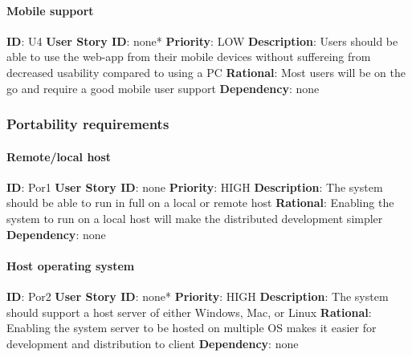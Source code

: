 \documentclass{article}
\begin{document}
\paragraph{Mobile support}\label{req:}
\textbf{ID}: U4\newline
\textbf{User Story ID}: none*\newline
\textbf{Priority}: LOW\newline
\textbf{Description}: Users should be able to use the web-app from their mobile devices without suffereing from decreased usability compared to using a PC\newline
\textbf{Rational}: Most users will be on the go and require a good mobile user support\newline
\textbf{Dependency}: none\newline

\subsubsection{Portability requirements}

\paragraph{Remote/local host}\label{req:}
\textbf{ID}: Por1\newline
\textbf{User Story ID}: none\newline
\textbf{Priority}: HIGH\newline
\textbf{Description}: The system should be able to run in full on a local or remote host\newline
\textbf{Rational}: Enabling the system to run on a local host will make the distributed development simpler\newline
\textbf{Dependency}: none\newline

\paragraph{Host operating system}\label{req:}
\textbf{ID}: Por2\newline
\textbf{User Story ID}: none*\newline
\textbf{Priority}: HIGH\newline
\textbf{Description}: The system should support a host server of either Windows, Mac, or Linux\newline
\textbf{Rational}: Enabling the system server to be hosted on multiple OS makes it easier for development and distribution to client\newline
\textbf{Dependency}: none\newline
\end{document}
